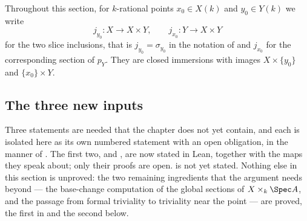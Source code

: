 Throughout this section, for $k$-rational points $x_0\in X(k)$ and
$y_0\in Y(k)$ we write
\[
  j_{y_0}\colon X\longrightarrow X\times Y,\qquad
  j_{x_0}\colon Y\longrightarrow X\times Y
\]
for the two slice inclusions, that is $j_{y_0}=\sigma_{y_0}$ in the notation of
 and $j_{x_0}$ for the corresponding section of
$p_Y$.  They are closed immersions with images $X\times\{y_0\}$ and
$\{x_0\}\times Y$.

\subsection*{The three new inputs}

Three statements are needed that the chapter does not yet contain, and each is
isolated here as its own numbered statement with an open obligation, in the
manner of .  The first two,
 and , are now
stated in Lean, together with the maps they speak about; only their proofs are
open.   is not yet stated.  Nothing else in this section is unproved: the two remaining
ingredients that the argument needs beyond
 --- the base-change computation
 of the global sections of
$X\times_k\Spec A$, and the passage
 from formal triviality to triviality near
the point --- are proved, the first in  and the second
below.

